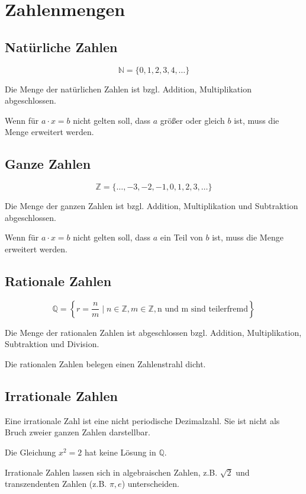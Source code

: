 \section{Zahlenmengen}

\subsection{Natürliche Zahlen}

\[
	\mathbb{N} = \{0, 1, 2, 3, 4, \ldots \}
\]

Die Menge der natürlichen Zahlen ist bzgl. Addition, Multiplikation
abgeschlossen.

Wenn für \(a \cdot x = b\) nicht gelten soll, dass \(a\)
größer oder gleich \(b\) ist, muss die Menge erweitert werden.

\subsection{Ganze Zahlen}

\[
	\mathbb{Z} = \{\ldots, -3, -2, -1, 0, 1, 2, 3, \ldots \}
\]

Die Menge der ganzen Zahlen ist bzgl. Addition, Multiplikation und Subtraktion
abgeschlossen.

Wenn für \(a \cdot x = b\) nicht gelten soll, dass \(a\) ein Teil
von \(b\) ist, muss die Menge erweitert werden.

\subsection{Rationale Zahlen}

\[
	\mathbb{Q} = \left \{r = \frac{n}{m} \mid n \in \mathbb{Z}, m \in \mathbb{Z},
	\text{n und m sind teilerfremd} \right \}
\]

Die Menge der rationalen Zahlen ist abgeschlossen bzgl. Addition,
Multiplikation, Subtraktion und Division.

Die rationalen Zahlen belegen einen Zahlenstrahl dicht.

\subsection{Irrationale Zahlen}

Eine irrationale Zahl ist eine nicht periodische Dezimalzahl.
Sie ist nicht als Bruch zweier ganzen Zahlen darstellbar.

Die Gleichung \(x^2 = 2\) hat keine Lösung in \(\mathbb{Q}\).

Irrationale Zahlen lassen sich in algebraischen Zahlen, z.B. \(\sqrt{2}\) und
transzendenten Zahlen (z.B. \(\pi, e\)) unterscheiden.

